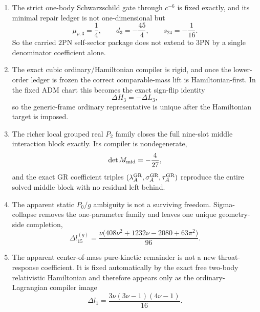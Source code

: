 \documentclass[11pt]{article}
\begin{document}
\begin{enumerate}
  \item The strict one-body Schwarzschild gate through $c^{-6}$ is fixed
  exactly, and its minimal repair ledger is not one-dimensional but
  \begin{equation}
  \mu_{\rho,3}=\frac14,
  \qquad
   d_3=-\frac{45}{4},
  \qquad
   s_{24}=-\frac1{16}.
  \label{eq:conclusions-onebody-ledger}
  \end{equation}
  So the carried $2$PN self-sector package does not extend to $3$PN by a single
  denominator coefficient alone.

  \item The exact cubic ordinary/Hamiltonian compiler is rigid, and once the
  lower-order ledger is frozen the correct comparable-mass lift is
  Hamiltonian-first.  In the fixed ADM chart this becomes the exact sign-flip
  identity
  \begin{equation}
  \Delta H_3=-\Delta L_3,
  \label{eq:conclusions-signflip}
  \end{equation}
  so the generic-frame ordinary representative is unique after the Hamiltonian
  target is imposed.

  \item The richer local grouped real $P_2$ family closes the full nine-slot
  middle interaction block exactly.  Its compiler is nondegenerate,
  \begin{equation}
  \det M_{\rm mid}=-\frac4{27},
  \label{eq:conclusions-det-mid}
  \end{equation}
  and the exact GR coefficient triples
  \((\lambda_A^{\rm GR},\sigma_A^{\rm GR},\tau_A^{\rm GR})\) reproduce the
  entire solved middle block with no residual left behind.

  \item The apparent static $P_0/g$ ambiguity is not a surviving freedom.
  Sigma-collapse removes the one-parameter family and leaves one unique
  geometry-side completion,
  \begin{equation}
  \Delta l_{15}^{(g)}
  =
  \frac{\nu\bigl(408\nu^2+1232\nu-2080+63\pi^2\bigr)}{96}.
  \label{eq:conclusions-geometry-coeff}
  \end{equation}

  \item The apparent center-of-mass pure-kinetic remainder is not a new
  throat-response coefficient.  It is fixed automatically by the exact free
  two-body relativistic Hamiltonian and therefore appears only as the
  ordinary-Lagrangian compiler image
  \begin{equation}
  \Delta l_1
  =
  \frac{3\nu(3\nu-1)(4\nu-1)}{16}.
  \label{eq:conclusions-kinetic-coeff}
  \end{equation}
\end{enumerate}
\end{document}
